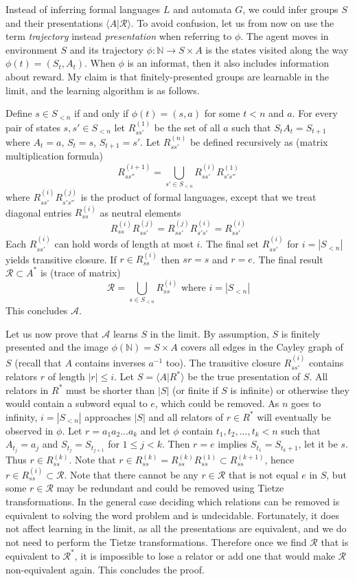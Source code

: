 \documentclass[12pt]{article}
\begin{document}
Instead of inferring formal languages $L$ and automata $G$, we could infer groups $S$ and their presentations $\langle A|\mathcal{R} \rangle$. To avoid confusion, let us from now on use the term \textit{trajectory} instead \textit{presentation} when referring to $\phi$. The agent moves in environment $S$ and its trajectory $\phi:\mathbb{N}\rightarrow S \times A$ is the states visited along the way $\phi(t)=(S_t,A_t)$. When $\phi$ is an informat, then it also includes information about reward. My claim is that finitely-presented groups are learnable in the limit, and the learning algorithm is as follows.

Define $s\in S_{<n}$ if and only if $\phi(t)=(s,a)$ for some $t< n$ and $a$. For every pair of states $s,s' \in S_{<n}$ let $R_{ss'}^{(1)}$ be the set of all $a$ such that $S_tA_t=S_{t+1}$ where $A_t=a$, $S_t=s$, $S_{t+1}=s'$. Let $R_{ss'}^{(n)}$ be defined recursively as (matrix multiplication formula)
\[
R_{ss''}^{(i+1)} = \bigcup\limits_{s'\in S_{<n}} R_{ss'}^{(i)}R_{s's''}^{(1)}
\]
where $R_{ss'}^{(i)}R_{s's''}^{(j)}$ is the product of formal languages, except that we treat diagonal entries $R_{ss}^{(i)}$ as neutral elements
\[
R_{ss}^{(i)}R_{ss'}^{(j)}=R_{ss'}^{(j)}R_{s's'}^{(i)}=R_{ss'}^{(i)}
\]
Each $R_{ss'}^{(i)}$ can hold words of length at most $i$.
The final set $R_{ss'}^{(i)}$ for $i=|S_{<n}|$ yields transitive closure. If $r\in R_{ss}^{(i)}$ then $sr=s$ and $r=e$. The final result $\mathcal{R}\subset A^*$ is (trace of matrix)
\[
\mathcal{R} = \bigcup\limits_{s\in S_{<n}} R_{ss}^{(i)}\text{ where }i=|S_{<n}|
\]
This concludes $\mathcal{A}$.


Let us now prove that $\mathcal{A}$ learns $S$ in the limit. By assumption, $S$ is finitely presented and the image $\phi(\mathbb{N})=S \times A$ covers all edges in the Cayley graph of $S$ (recall that $A$ contains inverses $a^{-1}$ too). The transitive closure $R_{ss'}^{(i)}$ contains relators $r$ of length $|r| \le i$. Let $S=\langle A | R^* \rangle$ be the true presentation of $S$. All relators in $R^*$ must be shorter than $|S|$ (or finite if $S$ is infinite) or otherwise they would contain a subword equal to $e$, which could be removed. As $n$ goes to infinity, $i=|S_{<n}|$ approaches $|S|$ and all relators of $r\in R^*$ will eventually be observed in $\phi$. Let $r=a_1a_2...a_k$ and let $\phi$ contain $t_1,t_2,...,t_k<n$ such that $A_{t_j}=a_j$ and $S_{t_j}=S_{t_{j+1}}$ for $1\le j < k$. Then $r=e$ implies $S_{t_1}=S_{t_{k}+1}$, let it be $s$. Thus $r\in R^{(k)}_{ss}$. Note that $r\in R^{(k)}_{ss}=R^{(k)}_{ss}R^{(1)}_{ss} \subset R^{(k+1)}_{ss}$, hence $r\in R^{(i)}_{ss} \subset \mathcal{R}$. Note that there cannot be any $r\in \mathcal{R}$ that is not equal $e$ in $S$, but some $r\in \mathcal{R}$ may be redundant and could be removed using Tietze transformations. In the general case deciding which relations can be removed is equivalent to solving the word problem and is undecidable. Fortunately, it does not affect learning in the limit, as all the presentations are equivalent, and we do not need to perform the Tietze transformations. Therefore once we find $ \mathcal{R}$ that is equivalent to $ \mathcal{R}^{*}$, it is impossible to lose a relator or add one that would make $ \mathcal{R}$ non-equivalent again. This concludes the proof.
\end{document}

